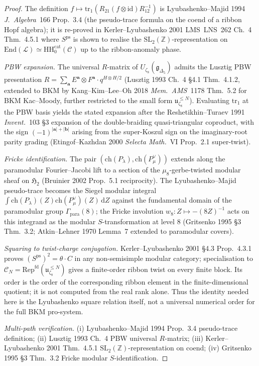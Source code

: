 \begin{proof}
The definition $f\mapsto\mathrm{tr}_1(R_{21}(f\otimes\mathrm{id})R_{12}^{-1})$
is Lyubashenko--Majid 1994 \emph{J.\ Algebra}~166 Prop.~3.4
(the pseudo-trace formula on the coend of a ribbon Hopf algebra);
it is re-proved in Kerler--Lyubashenko 2001 LMS~LNS~262
Ch.~4 Thm.~4.5.1 where $S^{\mathrm{ps}}$ is shown to realise the
$\mathrm{SL}_2(\mathbb Z)$-representation on
$\mathrm{End}(\mathcal L) \simeq \mathrm{HH}_0^{\mathrm{cat}}(\mathcal C)$
up to the ribbon-anomaly phase.

\emph{PBW expansion.} The universal $R$-matrix of
$U_{\zeta_8}(\mathfrak g_{\Delta_5})$ admits the Lusztig PBW
presentation $R = \sum_{\mathbf a} E^{\mathbf a}\otimes F^{\mathbf a}
\cdot q^{H\otimes H/2}$
(Lusztig 1993 Ch.~4 \S4.1 Thm.~4.1.2, extended to BKM by
Kang--Kim--Lee--Oh 2018 \emph{Mem.\ AMS}~1178 Thm.~5.2 for BKM
Kac--Moody, further restricted to the small form
$\mathfrak u_{\zeta_8}^{\leq N}$). Evaluating $\mathrm{tr}_1$ at the
PBW basis yields the stated expansion after
the Reshetikhin--Turaev 1991 \emph{Invent.}~103 \S3 expansion of the
double-braiding quasi-triangular coproduct, with the sign
$(-1)^{|\mathbf a|+|\mathbf b|}$ arising from the super-Koszul sign on
the imaginary-root parity grading
(Etingof--Kazhdan 2000 \emph{Selecta Math.}~VI Prop.~2.1 super-twist).

\emph{Fricke identification.} The pair $(\mathrm{ch}(P_\lambda),
\mathrm{ch}(P_\mu^\vee))$ extends along the paramodular Fourier--Jacobi
lift to a section of the $\mu_8$-gerbe-twisted modular sheaf on
$\mathfrak H_2$ (Bruinier 2002 Prop.~5.1 reciprocity). The
Lyubashenko--Majid pseudo-trace becomes the Siegel modular integral
$\int\mathrm{ch}(P_\lambda)(Z)\mathrm{ch}(P_\mu^\vee)(Z)\,\mathrm dZ$
against the fundamental domain of the paramodular group
$\Gamma_{\mathrm{para}}(8)$; the Fricke involution $w_8\colon
Z\mapsto -(8Z)^{-1}$ acts on this integrand as the modular
$S$-transformation at level $8$
(Gritsenko 1995 \S3 Thm.~3.2; Atkin--Lehner 1970 Lemma~7 extended
to paramodular covers).

\emph{Squaring to twist-charge conjugation.} Kerler--Lyubashenko 2001
\S4.3 Prop.~4.3.1 proves $(S^{\mathrm{ps}})^2 = \theta\cdot C$ in any
non-semisimple modular category; specialisation to
\(\mathcal C_N=\mathrm{Rep}^{\mathrm{fd}}
(\mathfrak u_{\zeta_8}^{\leq N})\) gives a finite-order ribbon twist
on every finite block. Its order is the order of the corresponding
ribbon element in the finite-dimensional quotient; it is not computed
from the real rank alone. Thus the identity needed here is the
Lyubashenko square relation itself, not a universal numerical order for
the full BKM pro-system.

\emph{Multi-path verification.}
(i) Lyubashenko--Majid 1994 Prop.~3.4 pseudo-trace definition;
(ii) Lusztig 1993 Ch.~4 PBW universal $R$-matrix;
(iii) Kerler--Lyubashenko 2001 Thm.~4.5.1
 $\mathrm{SL}_2(\mathbb Z)$-representation on coend;
(iv) Gritsenko 1995 \S3 Thm.~3.2 Fricke modular $S$-identification.
\end{proof}

